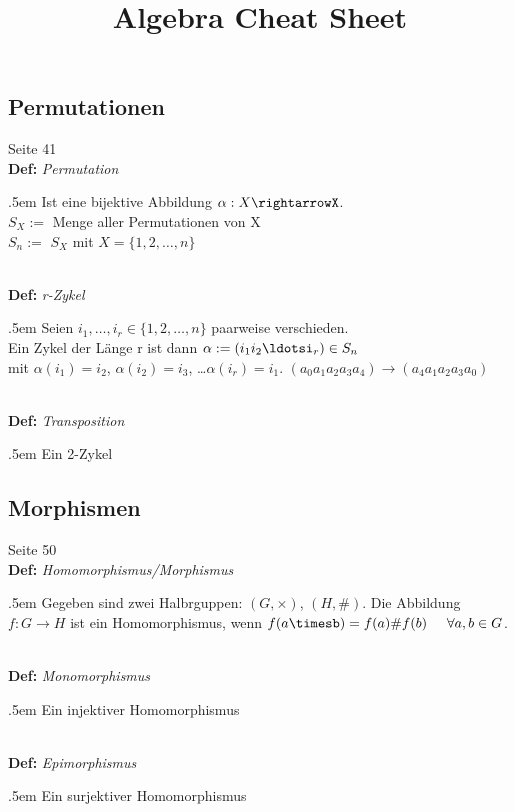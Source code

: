 \documentclass[twocolumn, 10pt]{article}
\newenvironment {definition}
                [1][]
                {\noindent\\{\bf
                Def:}\emph{
                #1}\indent\begin{addmargin}{.5em}}{\end{addmargin}}
\begin{document}
\title{Algebra Cheat Sheet}
\maketitle



\subsection*{Permutationen}

{\tiny Seite 41}
\begin{definition}[Permutation]
Ist eine bijektive Abbildung $\alpha:X\rightarrowX$.\\
$S_X := $ Menge aller Permutationen von X\\
$S_n := $ $S_X$ mit $X=\{1, 2,\ldots,n\}$
\end{definition}

\begin{definition}[r-Zykel]
Seien $i_1,\ldots,i_r \in \{1, 2,\ldots,n\}$ paarweise verschieden.\\
Ein Zykel der Länge r ist dann $\alpha:=(i_1i_2\ldotsi_r) \in S_n$ \\mit
$\alpha(i_1)=i_2$, $\alpha(i_2)=i_3$, \ldots $\alpha(i_r)=i_1$.
$(a_0a_1a_2a_3a_4) \rightarrow (a_4a_1a_2a_3a_0)$
\end{definition}

\begin{definition}[Transposition]
Ein 2-Zykel
\end{definition}



\subsection*{Morphismen}

{\tiny Seite 50}
\begin{definition}[Homomorphismus/Morphismus]
Gegeben sind zwei Halbrguppen: $(G, \times)$, $(H, \#)$. Die Abbildung
$f:G \rightarrow H$ ist ein Homomorphismus, wenn
$f(a\timesb)=f(a)\#f(b)\hspace{.5cm}\forall a,b \in G$.
\end{definition}

\begin{definition}[Monomorphismus]
Ein injektiver Homomorphismus
\end{definition}

\begin{definition}[Epimorphismus]
Ein surjektiver Homomorphismus
\end{definition}
\end{document}
